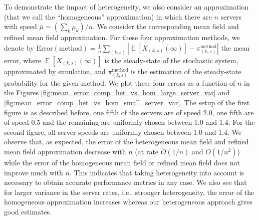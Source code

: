 \documentclass[acmsmall]{acmart}
\DeclareMathOperator{\E}{\mathbb{E}} %
\newcommand\esp[1]{\E\left[#1\right]} %
\newcommand\abs[1]{\left|#1\right|}         %
\begin{document}
To demonstrate the impact of heterogeneity, we also consider an approximation (that we call the ``homogeneous'' approximation) in which there are $n$ servers with speed $\bar{\mu}=(\sum_k\mu_k)/n$. We consider the corresponding mean field and refined mean field approximation. For these four approximation methods, we denote by $\mathrm{Error}(\mathrm{method})=\frac1n \sum_{(k,s)}\abs{\esp{X_{(k,s)}(\infty)} - \pi^{\mathrm{method}}_{(k,s)}}$ the mean error, where $\esp{X_{(k,s)}(\infty)}$ is the steady-state of the stochastic system, approximated by simulation, and $\pi^{\mathrm{method}}_{(k,s)}$ is the estimation of the steady-state probability for the given method. We plot these four errors as a function of $n$ in the Figures \ref{fig:mean_error_comp_het_vs_hom_large_server_var} and \ref{fig:mean_error_comp_het_vs_hom_small_server_var}. The setup of the first figure is as described before, one fifth of the servers are of speed $2.0$, one fifth are of speed $0.5$ and the remaining are uniformly chosen between $1.0$ and $1.4$. For the second figure, all server speeds are uniformly chosen between $1.0$ and $1.4$. 
We observe that, as expected, the error of the heterogeneous mean field and refined mean field approximation decrease with $n$ (at rate $O(1/n)$ and $O(1/n^2)$) while the error of the homogeneous mean field or refined mean field does not improve much with $n$. This indicates that taking heterogeneity into account is necessary to obtain accurate performance metrics in any case. We also see that for larger variance in the server rates, i.e., stronger heterogeneity, the error of the homogeneous approximation increases whereas our heterogeneous approach gives good estimates. 
\end{document}
